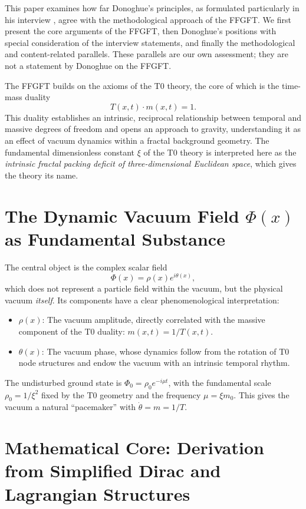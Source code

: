 	This paper examines how far Donoghue's principles, as formulated particularly in his interview \cite{DonoghueInterview2025}, agree with the methodological approach of the FFGFT. We first present the core arguments of the FFGFT, then Donoghue's positions with special consideration of the interview statements, and finally the methodological and content-related parallels. These parallels are our own assessment; they are not a statement by Donoghue on the FFGFT.
	
	
	The FFGFT builds on the axioms of the T0 theory, the core of which is the time-mass duality
	\[
	T(x,t) \cdot m(x,t) = 1.
	\]
	This duality establishes an intrinsic, reciprocal relationship between temporal and massive degrees of freedom and opens an approach to gravity, understanding it as an effect of vacuum dynamics within a fractal background geometry. The fundamental dimensionless constant $\xi$ of the T0 theory is interpreted here as the \emph{intrinsic fractal packing deficit of three-dimensional Euclidean space}, which gives the theory its name.
	
\section{The Dynamic Vacuum Field \texorpdfstring{$\Phi(x)$}{Phi(x)} as Fundamental Substance}
	
	The central object is the complex scalar field
	\[
	\Phi(x) = \rho(x) e^{i\theta(x)},
	\]
	which does not represent a particle field within the vacuum, but the physical vacuum \emph{itself}. Its components have a clear phenomenological interpretation:
	\begin{itemize}
		\item $\rho(x)$: The vacuum amplitude, directly correlated with the massive component of the T0 duality: $m(x,t) = 1/T(x,t)$.
		\item $\theta(x)$: The vacuum phase, whose dynamics follow from the rotation of T0 node structures and endow the vacuum with an intrinsic temporal rhythm.
	\end{itemize}
	
	The undisturbed ground state is $\Phi_0 = \rho_0 e^{-i\mu t}$, with the fundamental scale $\rho_0 = 1/\xi^2$ fixed by the T0 geometry and the frequency $\mu = \xi m_0$. This gives the vacuum a natural ``pacemaker'' with $\dot{\theta} = m = 1/T$.
	
	\section{Mathematical Core: Derivation from Simplified Dirac and Lagrangian Structures}
	
